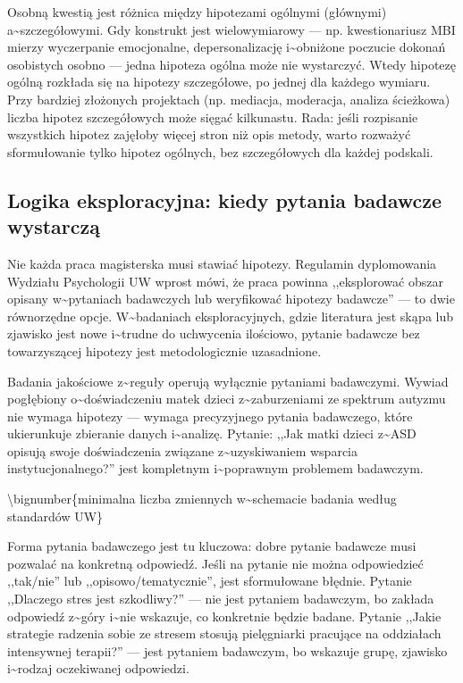 \documentclass[12pt,a4paper,twoside,openany]{book}
\begin{document}
Osobną kwestią jest różnica między hipotezami ogólnymi (głównymi) a\textasciitilde{}szczegółowymi. Gdy konstrukt jest wielowymiarowy --- np. kwestionariusz MBI mierzy wyczerpanie emocjonalne, depersonalizację i\textasciitilde{}obniżone poczucie dokonań osobistych osobno --- jedna hipoteza ogólna może nie wystarczyć. Wtedy hipotezę ogólną rozkłada się na hipotezy szczegółowe, po jednej dla każdego wymiaru. Przy bardziej złożonych projektach (np. mediacja, moderacja, analiza ścieżkowa) liczba hipotez szczegółowych może sięgać kilkunastu. Rada: jeśli rozpisanie wszystkich hipotez zajęłoby więcej stron niż opis metody, warto rozważyć sformułowanie tylko hipotez ogólnych, bez szczegółowych dla każdej podskali.


\subsection{Logika eksploracyjna: kiedy pytania badawcze wystarczą}


Nie każda praca magisterska musi stawiać hipotezy. Regulamin dyplomowania Wydziału Psychologii UW wprost mówi, że praca powinna ,,eksplorować obszar opisany w\textasciitilde{}pytaniach badawczych lub weryfikować hipotezy badawcze'' --- to dwie równorzędne opcje. W\textasciitilde{}badaniach eksploracyjnych, gdzie literatura jest skąpa lub zjawisko jest nowe i\textasciitilde{}trudne do uchwycenia ilościowo, pytanie badawcze bez towarzyszącej hipotezy jest metodologicznie uzasadnione.


Badania jakościowe z\textasciitilde{}reguły operują wyłącznie pytaniami badawczymi. Wywiad pogłębiony o\textasciitilde{}doświadczeniu matek dzieci z\textasciitilde{}zaburzeniami ze spektrum autyzmu nie wymaga hipotezy --- wymaga precyzyjnego pytania badawczego, które ukierunkuje zbieranie danych i\textasciitilde{}analizę. Pytanie: ,,Jak matki dzieci z\textasciitilde{}ASD opisują swoje doświadczenia związane z\textasciitilde{}uzyskiwaniem wsparcia instytucjonalnego?'' jest kompletnym i\textasciitilde{}poprawnym problemem badawczym.


\textbackslash{}bignumber\{minimalna liczba zmiennych w\textasciitilde{}schemacie badania według standardów UW\}


Forma pytania badawczego jest tu kluczowa: dobre pytanie badawcze musi pozwalać na konkretną odpowiedź. Jeśli na pytanie nie można odpowiedzieć ,,tak/nie'' lub ,,opisowo/tematycznie'', jest sformułowane błędnie. Pytanie ,,Dlaczego stres jest szkodliwy?'' --- nie jest pytaniem badawczym, bo zakłada odpowiedź z\textasciitilde{}góry i\textasciitilde{}nie wskazuje, co konkretnie będzie badane. Pytanie ,,Jakie strategie radzenia sobie ze stresem stosują pielęgniarki pracujące na oddziałach intensywnej terapii?'' --- jest pytaniem badawczym, bo wskazuje grupę, zjawisko i\textasciitilde{}rodzaj oczekiwanej odpowiedzi.
\end{document}
